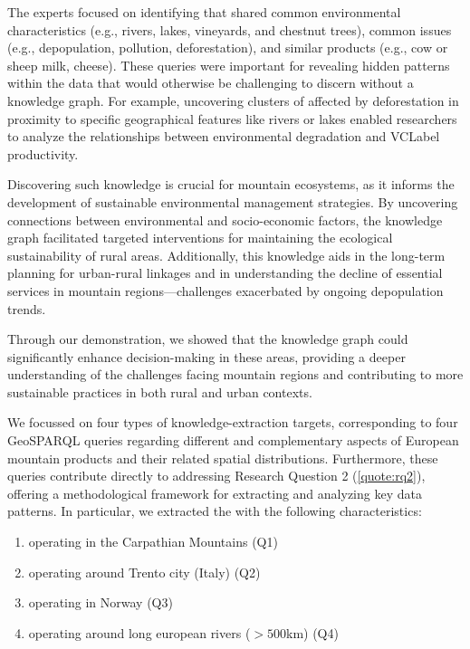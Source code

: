 The experts focused on identifying  that shared common environmental characteristics (e.g., rivers, lakes, vineyards, and chestnut trees), common issues (e.g., depopulation, pollution, deforestation), and similar products (e.g., cow or sheep milk, cheese). These queries were important for revealing hidden patterns within the data that would otherwise be challenging to discern without a knowledge graph. For example, uncovering clusters of  affected by deforestation in proximity to specific geographical features like rivers or lakes enabled researchers to analyze the relationships between environmental degradation and \acrshort{VCLabel} productivity.

Discovering such knowledge is crucial for mountain ecosystems, as it informs the development of sustainable environmental management strategies. By uncovering connections between environmental and socio-economic factors, the knowledge graph facilitated targeted interventions for maintaining the ecological sustainability of rural areas. Additionally, this knowledge aids in the long-term planning for urban-rural linkages and in understanding the decline of essential services in mountain regions—challenges exacerbated by ongoing depopulation trends.

Through our demonstration, we showed that the knowledge graph could significantly enhance decision-making in these areas, providing a deeper understanding of the challenges facing mountain regions and contributing to more sustainable practices in both rural and urban contexts.

We focussed on four types of knowledge-extraction targets, corresponding to four GeoSPARQL queries regarding different and complementary aspects of European mountain products and their related spatial distributions.  Furthermore, these queries contribute directly to addressing Research Question 2 (\ref{quote:rq2}), offering a methodological framework for extracting and analyzing key data patterns. In particular, we extracted the  with the following characteristics:
\begin{enumerate}
    \item operating in the Carpathian Mountains (Q1)
    \item operating around Trento city (Italy) (Q2)
    \item operating in Norway (Q3)
    \item operating around long european rivers ($>500$km) (Q4)
\end{enumerate}

